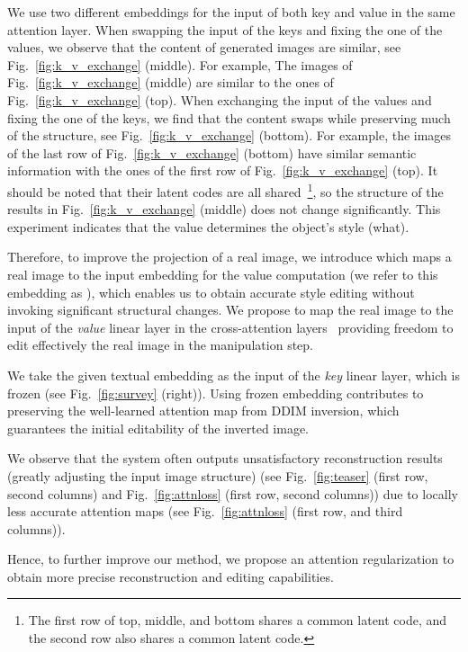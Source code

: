 \documentclass[twocolumn]{svjour3}          \smartqed  \usepackage{graphicx}
\begin{document}
We use two different embeddings for the input of both key and value in the same attention layer. When swapping the input of the keys and fixing the one of the values, we observe that the content of generated images are similar,  see Fig.~\ref{fig:k_v_exchange} (middle). For example, The images of Fig.~\ref{fig:k_v_exchange} (middle) are similar to the ones of  Fig.~\ref{fig:k_v_exchange} (top).  When exchanging the input of the values and fixing the one of the keys, we find that the content swaps while preserving much of the structure,  see Fig.~\ref{fig:k_v_exchange} (bottom). For example, the images of the last row of Fig.~\ref{fig:k_v_exchange} (bottom) have similar semantic information  with the ones of the first row of Fig.~\ref{fig:k_v_exchange} (top).  It should be noted that their latent codes are all shared~\footnote{The first row of top, middle, and bottom shares a common latent code, and the second row also shares a common latent code.}, so the structure of the results in Fig.~\ref{fig:k_v_exchange} (middle) does not change significantly.
This experiment indicates that the value determines the object's style (what).  


Therefore, to improve the projection of a real image, we introduce  which maps a real image to the input embedding for the value computation (we refer to this embedding as ),  which enables us to obtain accurate style editing without invoking significant structural changes. 
We propose to map the real image to the input of the \textit{value} linear layer in the cross-attention layers~\citep{bahdanau2014neural,NIPS2017_3f5ee243} providing freedom to edit effectively the real image in the manipulation step.

We take the given textual embedding as  the input of the \textit{key} linear layer, which is frozen (see Fig.~\ref{fig:survey} (right)). Using frozen embedding contributes to preserving the well-learned attention map from DDIM inversion, which guarantees the initial editability of the inverted image. 

We observe that the system often outputs unsatisfactory reconstruction results (greatly adjusting the input image structure) (see Fig.~\ref{fig:teaser} (first row, second columns) and Fig.~\ref{fig:attnloss} (first row, second columns)) due to locally less accurate attention maps (see Fig.~\ref{fig:attnloss} (first row, and third columns)). 

Hence, to further improve our method, we propose an attention regularization to obtain more precise reconstruction and editing capabilities.
\end{document}
